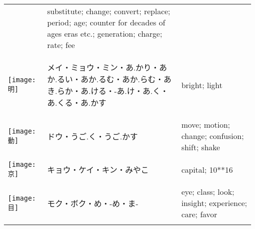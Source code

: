 \documentclass[a4paper,12pt]{extarticle}
\begin{document}
\begin{longtable}{|lp{6cm}p{4cm}|}
&
substitute; change; convert; replace; period; age; counter for decades of ages eras etc.; generation; charge; rate; fee
\\ 
\begin{minipage}{0.3\textwidth}
\centerline{
	\texttt{[image: 明]}
}
\end{minipage}
&
\begin{CJK}{UTF8}{min}メイ・ミョウ・ミン・あ.かり・あか.るい・あか.るむ・あか.らむ・あき.らか・あ.ける・-あ.け・あ.く・あ.くる・あ.かす\end{CJK}
&
bright; light
\\ 
\begin{minipage}{0.3\textwidth}
\centerline{
	\texttt{[image: 動]}
}
\end{minipage}
&
\begin{CJK}{UTF8}{min}ドウ・うご.く・うご.かす\end{CJK}
&
move; motion; change; confusion; shift; shake
\\ 
\begin{minipage}{0.3\textwidth}
\centerline{
	\texttt{[image: 京]}
}
\end{minipage}
&
\begin{CJK}{UTF8}{min}キョウ・ケイ・キン・みやこ\end{CJK}
&
capital; 10**16
\\ 
\begin{minipage}{0.3\textwidth}
\centerline{
	\texttt{[image: 目]}
}
\end{minipage}
&
\begin{CJK}{UTF8}{min}モク・ボク・め・-め・ま-\end{CJK}
&
eye; class; look; insight; experience; care; favor
\\ 
\begin{minipage}{0.3\textwidth}

\end{minipage}
\end{longtable}
\end{document}
